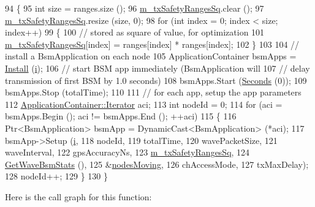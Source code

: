 \begin{DoxyCode}
94 \{
95   \textcolor{keywordtype}{int} size = ranges.size ();
96   \hyperlink{classns3_1_1WaveBsmHelper_a44eb2f603f58383dadc9b41eae68d5c9}{m\_txSafetyRangesSq}.clear ();
97   \hyperlink{classns3_1_1WaveBsmHelper_a44eb2f603f58383dadc9b41eae68d5c9}{m\_txSafetyRangesSq}.resize (size, 0);
98   \textcolor{keywordflow}{for} (\textcolor{keywordtype}{int} index = 0; index < size; index++)
99     \{
100       \textcolor{comment}{// stored as square of value, for optimization}
101       \hyperlink{classns3_1_1WaveBsmHelper_a44eb2f603f58383dadc9b41eae68d5c9}{m\_txSafetyRangesSq}[index] = ranges[index] * ranges[index];
102     \}
103 
104   \textcolor{comment}{// install a BsmApplication on each node}
105   ApplicationContainer bsmApps = \hyperlink{classns3_1_1WaveBsmHelper_a1f30ea7ae1ed3d1f10760b876b69b349}{Install} (\hyperlink{bernuolliDistribution_8m_a6f6ccfcf58b31cb6412107d9d5281426}{i});
106   \textcolor{comment}{// start BSM app immediately (BsmApplication will}
107   \textcolor{comment}{// delay transmission of first BSM by 1.0 seconds)}
108   bsmApps.Start (\hyperlink{group__timecivil_ga33c34b816f8ff6628e33d5c8e9713b9e}{Seconds} (0));
109   bsmApps.Stop (totalTime);
110 
111   \textcolor{comment}{// for each app, setup the app parameters}
112   \hyperlink{classns3_1_1ApplicationContainer_a46d9e435701ffbca57fff95b97cbf0dc}{ApplicationContainer::Iterator} aci;
113   \textcolor{keywordtype}{int} nodeId = 0;
114   \textcolor{keywordflow}{for} (aci = bsmApps.Begin (); aci != bsmApps.End (); ++aci)
115     \{
116       Ptr<BsmApplication> bsmApp = DynamicCast<BsmApplication> (*aci);
117       bsmApp->Setup (\hyperlink{bernuolliDistribution_8m_a6f6ccfcf58b31cb6412107d9d5281426}{i},
118                      nodeId,
119                      totalTime,
120                      wavePacketSize,
121                      waveInterval,
122                      gpsAccuracyNs,
123                      \hyperlink{classns3_1_1WaveBsmHelper_a44eb2f603f58383dadc9b41eae68d5c9}{m\_txSafetyRangesSq},
124                      \hyperlink{classns3_1_1WaveBsmHelper_a7b7442d597cc104a22c8c4bef6c98c6e}{GetWaveBsmStats} (),
125                      &\hyperlink{classns3_1_1WaveBsmHelper_a281ee846d937729f0fe2a70fb23f7448}{nodesMoving},
126                      chAccessMode,
127                      txMaxDelay);
128       nodeId++;
129     \}
130 \}
\end{DoxyCode}


Here is the call graph for this function\+:


